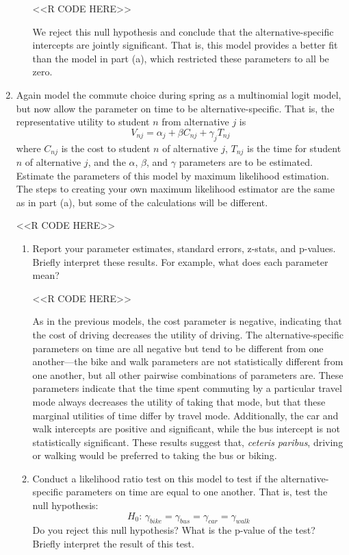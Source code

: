 \documentclass[11pt,letterpaper]{article}
\begin{document}
\begin{enumerate}[label=\alph*., leftmargin=*]
\begin{enumerate}[label=\roman*.]
		<<R CODE HERE>>

		We reject this null hypothesis and conclude that the alternative-specific intercepts are jointly significant. That is, this model provides a better fit than the model in part (a), which restricted these parameters to all be zero.
	\end{enumerate}
	
	\item Again model the commute choice during spring as a multinomial logit model, but now allow the parameter on time to be alternative-specific. That is, the representative utility to student $n$ from alternative $j$ is
	$$V_{nj} = \alpha_j + \beta C_{nj} + \gamma_j T_{nj}$$
	where $C_{nj}$ is the cost to student $n$ of alternative $j$, $T_{nj}$ is the time for student $n$ of alternative $j$, and the $\alpha$, $\beta$, and $\gamma$ parameters are to be estimated. Estimate the parameters of this model by maximum likelihood estimation. The steps to creating your own maximum likelihood estimator are the same as in part (a), but some of the calculations will be different.

	<<R CODE HERE>>

	\begin{enumerate}[label=\roman*.]
		\item Report your parameter estimates, standard errors, z-stats, and p-values. Briefly interpret these results. For example, what does each parameter mean?

		<<R CODE HERE>>

		As in the previous models, the cost parameter is negative, indicating that the cost of driving decreases the utility of driving. The alternative-specific parameters on time are all negative but tend to be different from one another---the bike and walk parameters are not statistically different from one another, but all other pairwise combinations of parameters are. These parameters indicate that the time spent commuting by a particular travel mode always decreases the utility of taking that mode, but that these marginal utilities of time differ by travel mode. Additionally, the car and walk intercepts are positive and significant, while the bus intercept is not statistically significant. These results suggest that, \emph{ceteris paribus}, driving or walking would be preferred to taking the bus or biking.

		\item Conduct a likelihood ratio test on this model to test if the alternative-specific parameters on time are equal to one another. That is, test the null hypothesis:
		$$H_0 \text{: } \gamma_{bike} = \gamma_{bus} = \gamma_{car} = \gamma_{walk}$$
		Do you reject this null hypothesis? What is the p-value of the test? Briefly interpret the result of this test.


\end{enumerate}
\end{enumerate}
\end{document}
